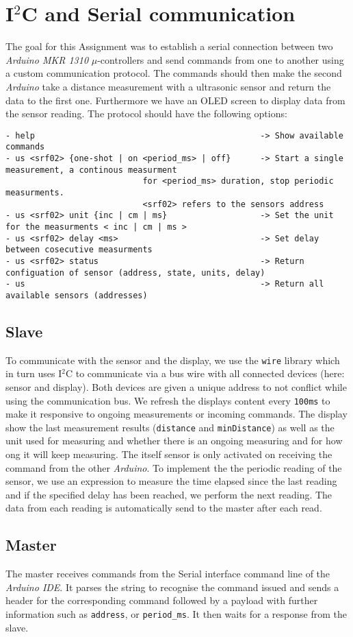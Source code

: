 \section{I$^2$C and Serial communication}

The goal for this Assignment was to establish a serial connection between two \textsl{Arduino MKR 1310} $\mu$-controllers and send commands from one to another using a custom communication protocol. The commands should then make the second \textsl{Arduino} take a distance measurement with a ultrasonic sensor and return the data to the first one.
Furthermore we have an OLED screen to display data from the sensor reading.
The protocol should have the following options:
\begin{lstlisting}
- help                                              -> Show available commands
- us <srf02> {one-shot | on <period_ms> | off}      -> Start a single measurement, a continous measurment 
							for <period_ms> duration, stop periodic measurments. 
							<srf02> refers to the sensors address
- us <srf02> unit {inc | cm | ms}                   -> Set the unit for the measurments < inc | cm | ms >
- us <srf02> delay <ms>                             -> Set delay between cosecutive measurments           
- us <srf02> status                                 -> Return configuation of sensor (address, state, units, delay)
- us                                                -> Return all available sensors (addresses)
\end{lstlisting}

\subsection*{Slave}
To communicate with the sensor and the display, we use the \texttt{wire} library which in turn uses I$^2$C to communicate via a bus wire with all connected devices (here: sensor and display). 
Both devices are given a unique address to not conflict while using the communication bus.
We refresh the displays content every \texttt{100ms} to make it responsive to ongoing measurements or incoming commands.
The display show the last measurement results (\texttt{distance} and \texttt{minDistance}) as well as the unit used for measuring and whether there is an ongoing measuring and for how ong it will keep measuring.
The itself sensor is only activated on receiving the command from the other \textsl{Arduino}.
To implement the the periodic reading of the sensor, we use an expression to measure the time elapsed since the last reading and if the specified delay has been reached, we perform the next reading.
The data from each reading is automatically send to the master after each read.

\subsection*{Master}
The master receives commands from the Serial interface command line of the \textsl{Arduino IDE}. It parses the string to recognise the command issued and  sends a header for the corresponding command followed by a payload with further information such as \texttt{address}, or \texttt{period\_ms}.
It then waits for a response from the slave.